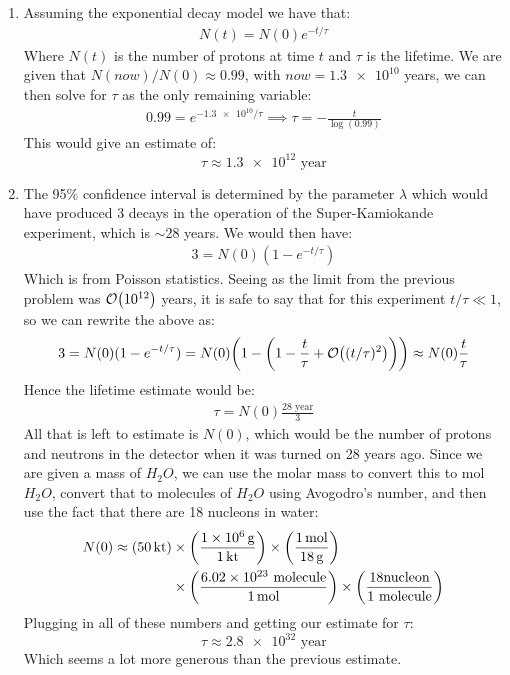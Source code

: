 \documentclass[12pt]{article}
\begin{document}
\begin{enumerate}[label=\alph*)]
\item Assuming the exponential decay model we have that:
  \begin{align*}
    N(t)=N(0)e^{-t/\tau}
  \end{align*}
  Where $N(t)$ is the number of protons at time $t$ and $\tau$ is the lifetime. We are given that $N(now)/N(0)\approx0.99$, with $now=\num{1.3e10}$ years, we can then solve for $\tau$ as the only remaining variable:
  \begin{align*}
    0.99=e^{-\num{1.3e10}/\tau}\implies\tau=-\frac{t}{\log(0.99)}
  \end{align*}
  This would give an estimate of:
  \begin{equation}
    \label{eq:p9a}
    \boxed{\tau\approx \num{1.3e12}\text{ year}}
  \end{equation}
\item The 95\% confidence interval is determined by the parameter $\lambda$ which would have produced 3 decays in the operation of the Super-Kamiokande experiment, which is $\sim28$ years. We would then have:
  \begin{align*}
    3=N(0)(1-e^{-t/\tau})
  \end{align*}
  Which is from Poisson statistics. Seeing as the limit from the previous problem was $\order{10^{12}}$ years, it is safe to say that for this experiment $t/\tau\ll1$, so we can rewrite the above as:
  \begin{align*}
    3=N(0)(1-e^{-t/\tau})=N(0)\qty(1-\qty(1-\frac{t}\tau+\order{(t/\tau)^2}))
    \approx N(0)\frac{t}\tau
  \end{align*}
  Hence the lifetime estimate would be:
  \begin{align*}
    \tau=N(0)\frac{28\text{ year}}{3}
  \end{align*}
  All that is left to estimate is $N(0)$, which would be the number of protons and neutrons in the detector when it was turned on 28 years ago. Since we are given a mass of $H_2O$, we can use the molar mass to convert this to mol $H_2O$, convert that to molecules of $H_2O$ using Avogodro's number, and then use the fact that there are 18 nucleons in water:
  \begin{align*}
    N(0)\approx(\SI{50}{\kilo\tonne})
    &\times\qty(\frac{\SI{1e6}{g}}{\SI{1}{\kilo\tonne}})
    \times\qty(\frac{\SI{1}{mol}}{\SI{18}{g}})\\
    &\times\qty(\frac{6.02\times10^{23}\text{ molecule}}{\SI{1}{mol}})
    \times\qty(\frac{18 \text{nucleon}}{1\text{ molecule}})
  \end{align*}
  Plugging in all of these numbers and getting our estimate for $\tau$:
  \begin{equation}
    \label{eq:p9b}
    \boxed{\tau\approx\num{2.8e32}\text{ year}}
  \end{equation}
  Which seems a lot more generous than the previous estimate.
\end{enumerate}
\end{document}

